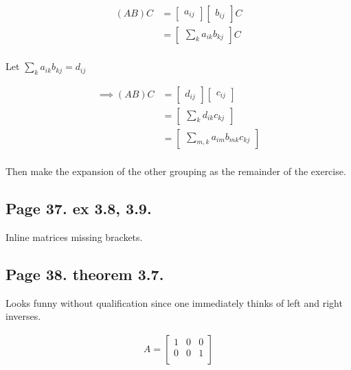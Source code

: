 \begin{align*}
(AB) C
&= 
\begin{bmatrix}
a_{ij} 
\end{bmatrix} 
\begin{bmatrix}
b_{ij} 
\end{bmatrix} C \\
&= 
\begin{bmatrix}
\sum_k a_{ik} b_{kj} 
\end{bmatrix} C \\
\end{align*}

Let $\sum_k a_{ik} b_{kj} = d_{ij}$

\begin{align*}
\implies
(AB) C
&= 
\begin{bmatrix}
d_{ij} 
\end{bmatrix} 
\begin{bmatrix}
c_{ij} 
\end{bmatrix} \\
&= 
\begin{bmatrix}
\sum_k d_{ik} c_{kj} 
\end{bmatrix} \\
&= 
\begin{bmatrix}
\sum_{m,k} a_{im} b_{mk} c_{kj} 
\end{bmatrix} \\
\end{align*}

Then make the expansion of the other grouping as the remainder of the exercise.

\subsection{Page 37.  ex 3.8, 3.9. }

Inline matrices missing brackets.

\subsection{Page 38.  theorem 3.7. }

Looks funny without qualification since one immediately thinks of left and
right inverses.

\begin{align*}
A = 
\begin{bmatrix}
1 & 0 & 0 \\
0 & 0 & 1 \\
\end{bmatrix}
\end{align*}

